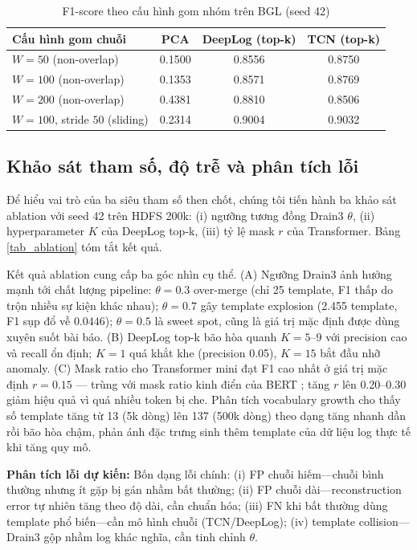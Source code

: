 \documentclass[conference]{IEEEtran}
\begin{document}
\begin{table}[htbp]
\caption{F1-score theo cấu hình gom nhóm trên BGL (seed 42)}
\begin{center}
\scriptsize
\setlength{\tabcolsep}{3pt}
\begin{tabular}{lccc}
\toprule
\textbf{Cấu hình gom chuỗi} & \textbf{PCA} & \textbf{DeepLog (top-k)} & \textbf{TCN (top-k)} \\
\midrule
$W=50$ (non-overlap) & 0.1500 & 0.8556 & 0.8750 \\
$W=100$ (non-overlap) & 0.1353 & 0.8571 & 0.8769 \\
$W=200$ (non-overlap) & 0.4381 & 0.8810 & 0.8506 \\
$W=100$, stride $50$ (sliding) & 0.2314 & 0.9004 & 0.9032 \\
\bottomrule
\end{tabular}
\label{tab_grouping}
\end{center}
\end{table}

\subsection{Khảo sát tham số, độ trễ và phân tích lỗi}
\label{sec:ablation}
Để hiểu vai trò của ba siêu tham số then chốt, chúng tôi tiến hành ba khảo sát ablation với seed 42 trên HDFS 200k: (i) ngưỡng tương đồng Drain3 $\theta$, (ii) hyperparameter $K$ của DeepLog top-k, (iii) tỷ lệ mask $r$ của Transformer. Bảng \ref{tab_ablation} tóm tắt kết quả.

Kết quả ablation cung cấp ba góc nhìn cụ thể. (A) Ngưỡng Drain3 ảnh hưởng mạnh tới chất lượng pipeline: $\theta{=}0.3$ over-merge (chỉ 25 template, F1 thấp do trộn nhiều sự kiện khác nhau); $\theta{=}0.7$ gây template explosion (2.455 template, F1 sụp đổ về $0.0446$); $\theta{=}0.5$ là sweet spot, cũng là giá trị mặc định được dùng xuyên suốt bài báo. (B) DeepLog top-k bão hòa quanh $K{=}5$--$9$ với precision cao và recall ổn định; $K{=}1$ quá khắt khe (precision 0.05), $K{=}15$ bắt đầu nhỡ anomaly. (C) Mask ratio cho Transformer mini đạt F1 cao nhất ở giá trị mặc định $r{=}0.15$ — trùng với mask ratio kinh điển của BERT \cite{b4}; tăng $r$ lên 0.20--0.30 giảm hiệu quả vì quá nhiều token bị che. Phân tích vocabulary growth cho thấy số template tăng từ 13 (5k dòng) lên 137 (500k dòng) theo dạng tăng nhanh dần rồi bão hòa chậm, phản ánh đặc trưng sinh thêm template của dữ liệu log thực tế khi tăng quy mô.

\textbf{Phân tích lỗi dự kiến:} Bốn dạng lỗi chính: (i) FP chuỗi hiếm---chuỗi bình thường nhưng ít gặp bị gán nhầm bất thường; (ii) FP chuỗi dài---reconstruction error tự nhiên tăng theo độ dài, cần chuẩn hóa; (iii) FN khi bất thường dùng template phổ biến---cần mô hình chuỗi (TCN/DeepLog); (iv) template collision---Drain3 gộp nhầm log khác nghĩa, cần tinh chỉnh $\theta$.
\end{document}
